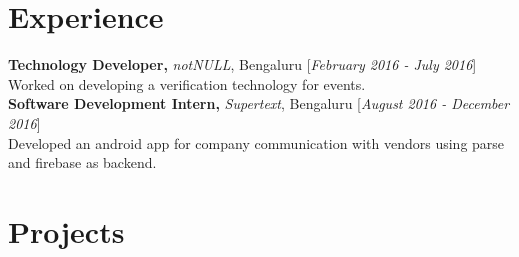 \documentclass[10pt]{article}
\begin{document}
\section{Experience} \textbf{Technology Developer,} \textit{notNULL},
Bengaluru \hfill [\textit{February 2016 - July 2016}]\\
Worked on developing a verification technology for events.
\medskip
\\
\textbf{Software Development Intern,} \textit{Supertext}, Bengaluru
\hfill [\textit{August 2016 - December 2016}]\\
Developed an android app for company communication with vendors using
parse and firebase as backend. 

\section{Projects}
\end{document}
